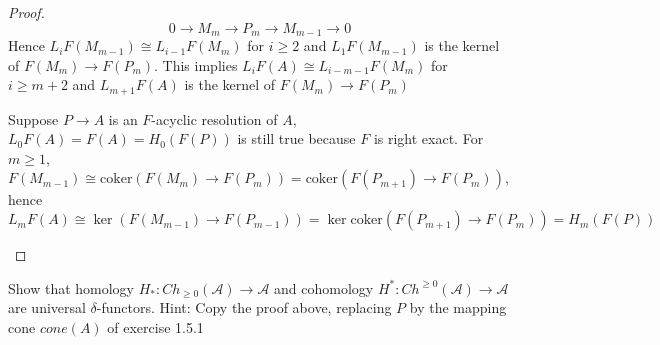 \documentclass{article}
\newenvironment{exercise}[2][Exercise]{\begin{trivlist}
\item[\hskip \labelsep {\bfseries #1}\hskip \labelsep {\bfseries #2.}]}{\end{trivlist}}
\theoremstyle{definition}
\theoremstyle{remark}
\theoremstyle{definition}
\begin{document}
\begin{proof}
\[0\to M_m\to P_m\to M_{m-1}\to0\]
Hence $L_iF(M_{m-1})\cong L_{i-1}F(M_m)$ for $i\geq2$ and $L_1F(M_{m-1})$ is the kernel of $F(M_m)\to F(P_m)$. This implies $L_iF(A)\cong L_{i-m-1}F(M_m)$ for $i\geq m+2$ and $L_{m+1}F(A)$ is the kernel of $F(M_m)\to F(P_m)$ \par
Suppose $P\to A$ is an $F$-acyclic resolution of $A$, $L_0F(A)=F(A)=H_0(F(P))$ is still true because $F$ is right exact. For $m\geq1$, $F(M_{m-1})\cong\mathrm{coker}(F(M_{m})\to F(P_m))=\mathrm{coker}(F(P_{m+1})\to F(P_m))$, hence $L_{m}F(A)\cong\ker(F(M_{m-1})\to F(P_{m-1}))=\ker\mathrm{coker}(F(P_{m+1})\to F(P_m))=H_m(F(P))$
\begin{center}
\end{center}
\end{proof}

\begin{exercise}{\textbf{2.4.4}}
Show that homology $H_*:Ch_{\geq0}(\mathscr A)\to\mathscr A$ and cohomology $H^*:Ch^{\geq0}(\mathscr A)\to\mathscr A$ are universal $\delta$-functors. Hint: Copy the proof above, replacing $P$ by the mapping cone $cone(A)$ of exercise 1.5.1
\end{exercise}
\end{document}
